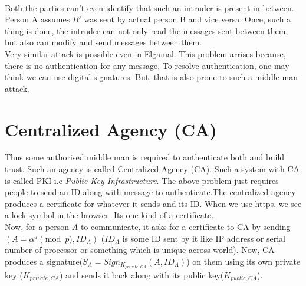 \documentclass[english, 11pt]{article}
\begin{document}
\begin{figure}[ht]

\centering   
\end{figure}
\\
Both the parties can't even identify that such an intruder is present in between. Person A assumes $B'$ was sent by actual person B and vice versa. Once, such a thing is done, the intruder can not only read the messages sent between them, but also can modify and send messages between them.\\
Very similar attack is possible even in Elgamal. This problem arrises because, there is no authentication for any message. To resolve authentication, one may think we can use digital signatures. But, that is also prone to such a middle man attack.

\section*{Centralized Agency (CA)}
Thus some authorised middle man is required to authenticate both and build trust. Such an agency is called Centralized Agency (CA). Such a system with CA is called PKI i.e \textit{Public Key Infrastructure}.
The above problem just requires people to send an ID along with message to authenticate.The centralized agency produces a certificate for whatever it sends and its ID. When we use https, we see a lock symbol in the browser. Its one kind of a certificate.\\
Now, for a person $A$ to communicate, it asks for a certificate to CA by sending $(A=\alpha^a \pmod{p} , ID_A)$ ($ID_A$ is some ID sent by it like IP address or serial number of processor or something which is unique across world). Now, CA produces a signature($S_A = Sign_{K_{private,CA}}(A,ID_A)$) on them using its own private key ($K_{private,CA}$) and sends it back along with its public key($K_{public,CA}$).
\end{document}
